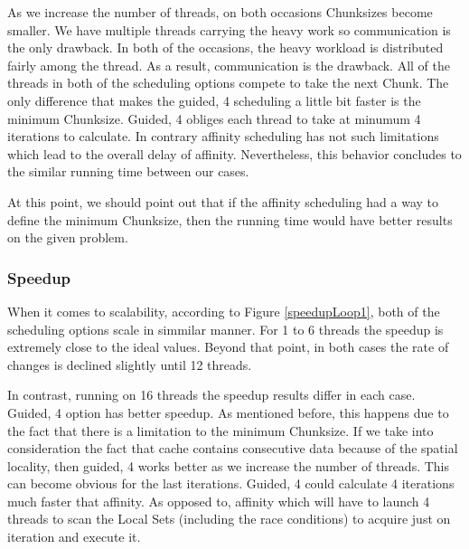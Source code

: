 \documentclass[12pt,a4paper]{article}
\begin{document}
As we increase the number of threads, on both occasions Chunksizes become smaller. We have multiple threads carrying the heavy work so communication is the only drawback. In both of the occasions, the heavy workload is distributed fairly among the thread. As a result, communication is the drawback. All of the threads in both of the scheduling options compete to take the next Chunk. The only difference that makes the guided, 4 scheduling a little bit faster is the minimum Chunksize. Guided, 4 obliges each thread to take at minumum 4 iterations to calculate. In contrary affinity scheduling has not such limitations which lead to the overall delay of affinity. Nevertheless, this behavior concludes to the similar running time between our cases.

At this point, we should point out that if the affinity scheduling had a way to define the minimum Chunksize, then the running time would have better results on the given problem.    

\subsubsection{Speedup}

When it comes to scalability, according to Figure \ref{speedupLoop1}, both of the scheduling options scale in simmilar manner. For 1 to 6 threads the speedup is extremely close to the ideal values. Beyond that point, in both cases the rate of changes is declined slightly until 12 threads.

In contrast, running on 16 threads the speedup results differ in each case. Guided, 4 option has better speedup. As mentioned before, this happens due to the fact that there is a limitation to the minimum Chunksize. If we take into consideration the fact that cache contains consecutive data because of the spatial locality, then guided, 4 works better as we increase the number of threads. This can become obvious for the last iterations. Guided, 4 could calculate 4 iterations much faster that affinity. As opposed to, affinity which will have to launch 4 threads to scan the Local Sets (including the race conditions) to acquire just on iteration and execute it.
\end{document}
